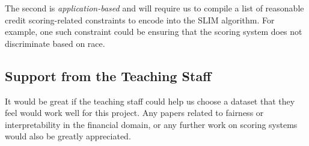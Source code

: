 \documentclass[11pt, margin=1in]{article}
\begin{document}
The second is \emph{application-based} and will require us to compile a list of reasonable credit scoring-related constraints to encode into the SLIM algorithm.  For example, one such constraint could be ensuring that the scoring system does not discriminate based on race.

\subsection{Support from the Teaching Staff} 
It would be great if the teaching staff could help us choose a dataset that they feel would work well for this project.  Any papers related to fairness or interpretability in the financial domain, or any further work on scoring systems would also be greatly appreciated. 




\end{document}

